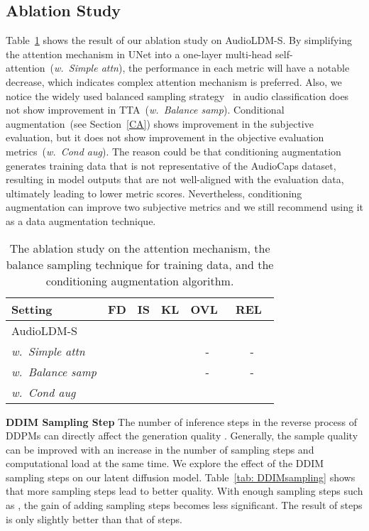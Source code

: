 \documentclass{article}
\begin{document}
\subsection{Ablation Study}

Table~\ref{tab: ablationstudy} shows the result of our ablation study on AudioLDM-S. By simplifying the attention mechanism in UNet into a one-layer multi-head self-attention~(\textit{w.~Simple attn}), the performance in each metric will have a notable decrease, which indicates complex attention mechanism is preferred. Also, we notice the widely used balanced sampling strategy~\cite{gong2021psla, liu2022ontology} in audio classification does not show improvement in TTA~(\textit{w.~Balance samp}). Conditional augmentation~(see Section~\ref{CA}) shows improvement in the subjective evaluation, but it does not show improvement in the objective evaluation metrics~(\textit{w.~Cond aug}). 
The reason could be that conditioning augmentation generates training data that is not representative of the AudioCaps dataset, resulting in model outputs that are not well-aligned with the evaluation data, ultimately leading to lower metric scores. Nevertheless, conditioning augmentation can improve two subjective metrics and we still recommend using it as a data augmentation technique.

\begin{table}[htbp]
\small
\centering
\begin{tabular}{lccc|cc}
\toprule
       Setting            & FD   & IS   & KL  & OVL~ & REL~ \\
\midrule
AudioLDM-S      &  &  &  &  &  \\
\textit{w.~Simple attn}             &  &  &  & - & - \\
\textit{w.~Balance samp} &       &      &     & - & - \\
\textit{w.~Cond aug}           &  &  &  &  &   \\
\bottomrule
\end{tabular}
\caption{The ablation study on the attention mechanism, the balance sampling technique for training data, and the conditioning augmentation algorithm.}
\label{tab: ablationstudy}
\end{table}

\textbf{DDIM Sampling Step} The number of inference steps in the reverse process of DDPMs can directly affect the generation quality \cite{DDPM,SGM}. Generally, the sample quality can be improved with an increase in the number of sampling steps and computational load at the same time. We explore the effect of the DDIM~\cite{song2020denoising} sampling steps on our latent diffusion model. Table~\ref{tab: DDIMsampling} shows that more sampling steps lead to better quality. With enough sampling steps such as , the gain of adding sampling steps becomes less significant. The result of  steps is only slightly better than that of  steps.
\end{document}
